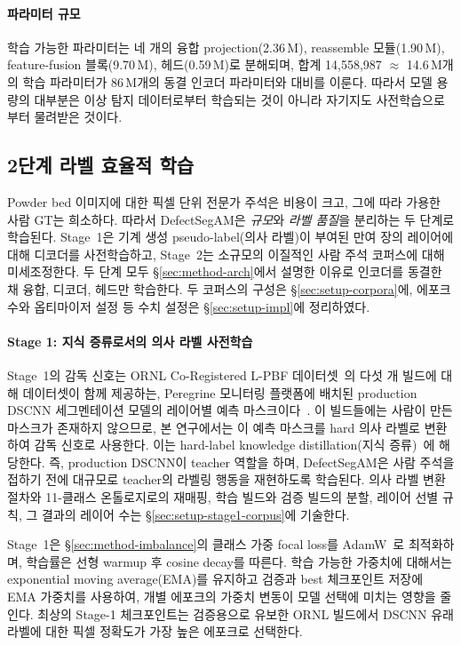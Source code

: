 \paragraph{파라미터 규모}
학습 가능한 파라미터는 네 개의 융합 projection(2.36\,M), reassemble
모듈(1.90\,M), feature-fusion 블록(9.70\,M), 헤드(0.59\,M)로 분해되며,
합계 14{,}558{,}987 $\approx$ 14.6\,M개의 학습 파라미터가 86\,M개의
동결 인코더 파라미터와 대비를 이룬다. 따라서 모델 용량의 대부분은
이상 탐지 데이터로부터 학습되는 것이 아니라 자기지도 사전학습으로부터
물려받은 것이다.

\subsection{2단계 라벨 효율적 학습}
\label{sec:method-training}

Powder bed 이미지에 대한 픽셀 단위 전문가 주석은 비용이 크고, 그에
따라 가용한 사람 GT는 희소하다. 따라서 DefectSegAM은 \emph{규모}와
\emph{라벨 품질}을 분리하는 두 단계로 학습된다. Stage~1은 기계 생성
pseudo-label(의사 라벨)이 부여된 만여 장의 레이어에 대해 디코더를
사전학습하고, Stage~2는 소규모의 이질적인 사람 주석 코퍼스에 대해
미세조정한다. 두 단계 모두 \S\ref{sec:method-arch}에서 설명한 이유로
인코더를 동결한 채 융합, 디코더, 헤드만 학습한다. 두 코퍼스의 구성은
\S\ref{sec:setup-corpora}에, 에포크 수와 옵티마이저 설정 등 수치
설정은 \S\ref{sec:setup-impl}에 정리하였다.

\paragraph{Stage 1: 지식 증류로서의 의사 라벨 사전학습}
Stage~1의 감독 신호는 ORNL Co-Registered L-PBF
데이터셋~\cite{ORNL_CoRegistered_Dataset,VPPM_Baseline}의 다섯 개
빌드에 대해 데이터셋이 함께 제공하는, Peregrine 모니터링 플랫폼에
배치된 production DSCNN 세그멘테이션 모델의 레이어별 예측
마스크이다~\cite{Scime2020DSCNN}. 이 빌드들에는 사람이 만든 마스크가
존재하지 않으므로, 본 연구에서는 이 예측 마스크를 hard 의사 라벨로
변환하여 감독 신호로 사용한다. 이는 hard-label knowledge
distillation(지식 증류)~\cite{Hinton2015KD}에 해당한다. 즉, production
DSCNN이 teacher 역할을 하며, DefectSegAM은 사람 주석을 접하기 전에
대규모로 teacher의 라벨링 행동을 재현하도록 학습된다. 의사 라벨 변환
절차와 11-클래스 온톨로지로의 재매핑, 학습 빌드와 검증 빌드의 분할,
레이어 선별 규칙, 그 결과의 레이어 수는
\S\ref{sec:setup-stage1-corpus}에 기술한다.

Stage~1은 \S\ref{sec:method-imbalance}의 클래스 가중 focal loss를
AdamW~\cite{Loshchilov2019AdamW}로 최적화하며, 학습률은 선형 warmup
후 cosine decay를 따른다. 학습 가능한 가중치에 대해서는 exponential
moving average(EMA)를 유지하고 검증과 best 체크포인트 저장에 EMA
가중치를 사용하여, 개별 에포크의 가중치 변동이 모델 선택에 미치는
영향을 줄인다. 최상의 Stage-1 체크포인트는 검증용으로 유보한 ORNL
빌드에서 DSCNN 유래 라벨에 대한 픽셀 정확도가 가장 높은 에포크로
선택한다.

